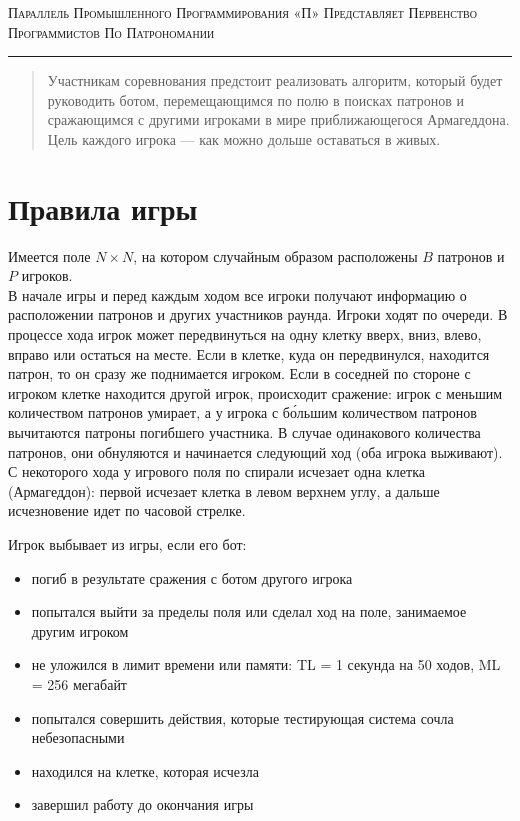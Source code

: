 \documentclass[a4paper,12pt]{article}
\begin{document}
\begin{center}
{\small\textsc{Параллель Промышленного Программирования «П» Представляет Первенство Программистов По Патрономании}}

\vskip 3pt \hrule \vskip 10pt

\end{center}
\begin{abstract}
Участникам соревнования предстоит реализовать алгоритм, который будет руководить ботом, перемещающимся по полю в поисках патронов и сражающимся с другими игроками в мире приближающегося Армагеддона. Цель каждого игрока --- как можно дольше оставаться в живых.
\end{abstract}

\section{Правила игры}
Имеется поле $N\times N$, на котором случайным образом расположены $B$ патронов и $P$ игроков. \\ В начале игры и перед каждым ходом все игроки получают информацию о расположении патронов и других участников раунда. Игроки ходят по очереди. В процессе хода игрок может передвинуться на одну клетку вверх, вниз, влево, вправо или остаться на месте. Если в клетке, куда он передвинулся, находится патрон, то он сразу же поднимается игроком. Если в соседней по стороне с игроком клетке находится другой игрок, происходит сражение: игрок с меньшим количеством патронов умирает, а у игрока с б\'{о}льшим количеством патронов вычитаются патроны погибшего участника. В случае одинакового количества патронов, они обнуляются и начинается следующий ход (оба игрока выживают). С некоторого хода у игрового поля по спирали исчезает одна клетка (Армагеддон): первой исчезает клетка в левом верхнем углу, а дальше исчезновение идет по часовой стрелке.
\begin{flushleft}
Игрок выбывает из игры, если его бот:
\begin{itemize}
\item погиб в результате сражения с ботом другого игрока
\item попытался выйти за пределы поля или сделал ход на поле, занимаемое другим игроком
\item не уложился в лимит времени или памяти:
TL = 1 секунда на 50 ходов, ML = 256 мегабайт
\item попытался совершить действия, которые тестирующая система сочла небезопасными
\item находился на клетке, которая исчезла
\item завершил работу до окончания игры
\end{itemize}
\end{flushleft}
\end{document}
